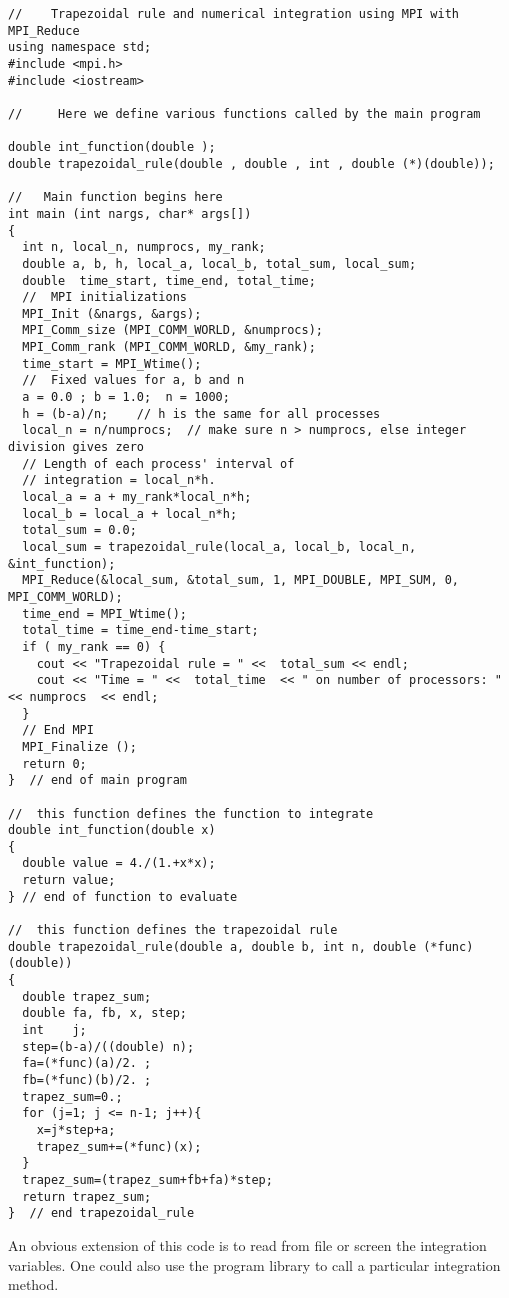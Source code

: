 \begin{lstlisting}[title={\url{http://folk.uio.no/mhjensen/compphys/programs/chapter04/program6.cpp}}]
//    Trapezoidal rule and numerical integration using MPI with MPI_Reduce
using namespace std;
#include <mpi.h>
#include <iostream>

//     Here we define various functions called by the main program

double int_function(double );
double trapezoidal_rule(double , double , int , double (*)(double));

//   Main function begins here
int main (int nargs, char* args[])
{
  int n, local_n, numprocs, my_rank;
  double a, b, h, local_a, local_b, total_sum, local_sum;
  double  time_start, time_end, total_time;
  //  MPI initializations
  MPI_Init (&nargs, &args);
  MPI_Comm_size (MPI_COMM_WORLD, &numprocs);
  MPI_Comm_rank (MPI_COMM_WORLD, &my_rank);
  time_start = MPI_Wtime();
  //  Fixed values for a, b and n
  a = 0.0 ; b = 1.0;  n = 1000;
  h = (b-a)/n;    // h is the same for all processes
  local_n = n/numprocs;  // make sure n > numprocs, else integer division gives zero
  // Length of each process' interval of
  // integration = local_n*h.
  local_a = a + my_rank*local_n*h;
  local_b = local_a + local_n*h;
  total_sum = 0.0;
  local_sum = trapezoidal_rule(local_a, local_b, local_n, &int_function);
  MPI_Reduce(&local_sum, &total_sum, 1, MPI_DOUBLE, MPI_SUM, 0, MPI_COMM_WORLD);
  time_end = MPI_Wtime();
  total_time = time_end-time_start;
  if ( my_rank == 0) {
    cout << "Trapezoidal rule = " <<  total_sum << endl;
    cout << "Time = " <<  total_time  << " on number of processors: "  << numprocs  << endl;
  }
  // End MPI
  MPI_Finalize ();
  return 0;
}  // end of main program

//  this function defines the function to integrate
double int_function(double x)
{
  double value = 4./(1.+x*x);
  return value;
} // end of function to evaluate

//  this function defines the trapezoidal rule
double trapezoidal_rule(double a, double b, int n, double (*func)(double))
{
  double trapez_sum;
  double fa, fb, x, step;
  int    j;
  step=(b-a)/((double) n);
  fa=(*func)(a)/2. ;
  fb=(*func)(b)/2. ;
  trapez_sum=0.;
  for (j=1; j <= n-1; j++){
    x=j*step+a;
    trapez_sum+=(*func)(x);
  }
  trapez_sum=(trapez_sum+fb+fa)*step;
  return trapez_sum;
}  // end trapezoidal_rule

\end{lstlisting}
An obvious extension of this code  is to read from file or screen the integration variables. One could also
use the program library to call a particular integration method.   



